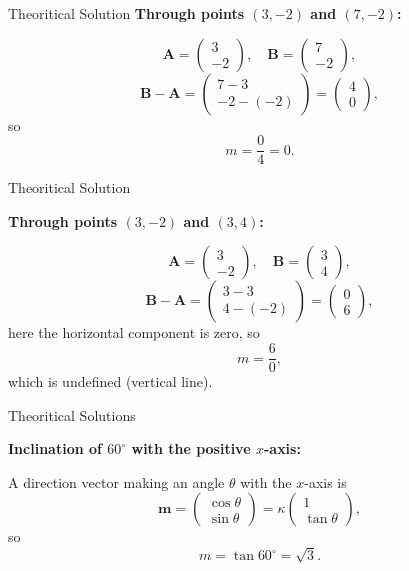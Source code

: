 \documentclass{beamer}
\begin{document}
\begin{frame}{Theoritical Solution}
  \textbf{Through points \((3,-2)\) and \((7,-2)\):}  

  \[
  \mathbf{A}=\begin{pmatrix}3\\-2\end{pmatrix},\quad
  \mathbf{B}=\begin{pmatrix}7\\-2\end{pmatrix},
  \]  
  \[
  \mathbf{B}-\mathbf{A}
    =\begin{pmatrix}7-3\\-2-(-2)\end{pmatrix}
    =\begin{pmatrix}4\\0\end{pmatrix},
  \]  
  so  
  \[
  m = \frac{0}{4}=0.
  \]
  \end{frame}
  \begin{frame}{Theoritical Solution}
      
 
   \textbf{Through points \((3,-2)\) and \((3,4)\):}  

  \[
  \mathbf{A}=\begin{pmatrix}3\\-2\end{pmatrix},\quad
  \mathbf{B}=\begin{pmatrix}3\\4\end{pmatrix},
  \]  
  \[
  \mathbf{B}-\mathbf{A}
    =\begin{pmatrix}3-3\\4-(-2)\end{pmatrix}
    =\begin{pmatrix}0\\6\end{pmatrix},
  \]  
  here the horizontal component is zero, so  
  \[
  m = \frac{6}{0},
  \]  
  which is undefined (vertical line).
  \end{frame}
  \begin{frame}{Theoritical Solutions}
      
  

  \textbf{Inclination of \(60^\circ\) with the positive \(x\)-axis:}  

  A direction vector making an angle \(\theta\) with the \(x\)-axis is  
  \[
  \mathbf{m}=\begin{pmatrix}\cos\theta \\ \sin\theta\end{pmatrix}
    =\kappa\begin{pmatrix}1\\\tan\theta\end{pmatrix},
  \]  
  so  
  \[
  m=\tan60^\circ=\sqrt{3}.
  \]






\end{frame}
\end{document}
